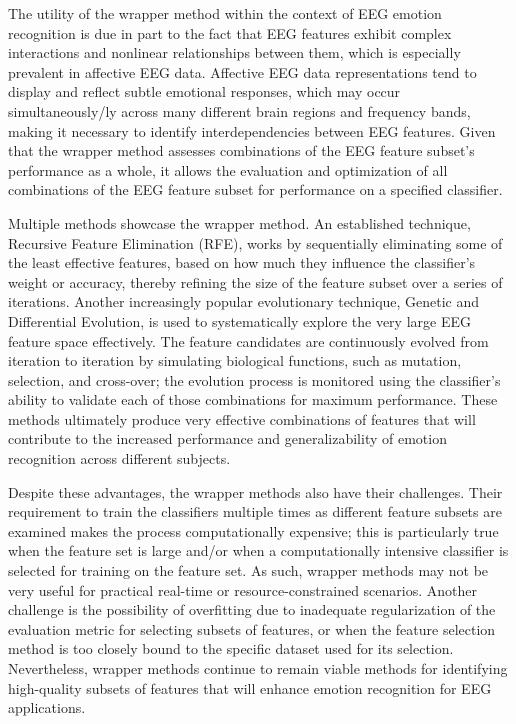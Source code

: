 \documentclass{WileyMSP-template}
\begin{document}
The utility of the wrapper method within the context of EEG emotion recognition is due in part to the fact that EEG features exhibit complex interactions and nonlinear relationships between them, which is especially prevalent in affective EEG data. Affective EEG data representations tend to display and reflect subtle emotional responses, which may occur simultaneously/ly across many different brain regions and frequency bands, making it necessary to identify interdependencies between EEG features. Given that the wrapper method assesses combinations of the EEG feature subset's performance as a whole, it allows the evaluation and optimization of all combinations of the EEG feature subset for performance on a specified classifier.

Multiple methods showcase the wrapper method. An established technique, Recursive Feature Elimination (RFE), works by sequentially eliminating some of the least effective features, based on how much they influence the classifier's weight or accuracy, thereby refining the size of the feature subset over a series of iterations. Another increasingly popular evolutionary technique, Genetic and Differential Evolution, is used to systematically explore the very large EEG feature space effectively. The feature candidates are continuously evolved from iteration to iteration by simulating biological functions, such as mutation, selection, and cross-over; the evolution process is monitored using the classifier's ability to validate each of those combinations for maximum performance. These methods ultimately produce very effective combinations of features that will contribute to the increased performance and generalizability of emotion recognition across different subjects.

Despite these advantages, the wrapper methods also have their challenges. Their requirement to train the classifiers multiple times as different feature subsets are examined makes the process computationally expensive; this is particularly true when the feature set is large and/or when a computationally intensive classifier is selected for training on the feature set. As such, wrapper methods may not be very useful for practical real-time or resource-constrained scenarios. Another challenge is the possibility of overfitting due to inadequate regularization of the evaluation metric for selecting subsets of features, or when the feature selection method is too closely bound to the specific dataset used for its selection. Nevertheless, wrapper methods continue to remain viable methods for identifying high-quality subsets of features that will enhance emotion recognition for EEG applications.
\end{document}
